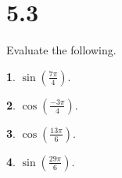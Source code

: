 \documentclass[12pt]{book}
\theoremstyle{definition}
\newtheorem{thm}{}
\begin{document}
\section*{5.3}
Evaluate the following.

\setcounter{thm}{1}
\begin{thm}
  $\displaystyle{\sin\left(\frac{7\pi}{4}\right)}$.
\end{thm}

\setcounter{thm}{3}
\begin{thm}
  $\displaystyle{\cos\left(\frac{-3\pi}{4}\right)}$.
\end{thm}

\setcounter{thm}{7}
\begin{thm}
  $\displaystyle{\cos\left(\frac{13\pi}{6}\right)}$.
\end{thm}

\setcounter{thm}{11}
\begin{thm}
  $\displaystyle{\sin\left(\frac{29\pi}{6}\right)}$.
\end{thm}
\end{document}
